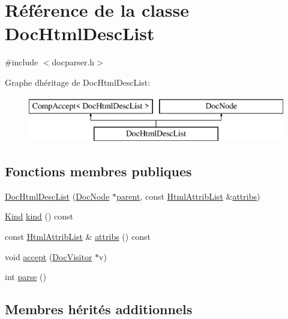 \hypertarget{class_doc_html_desc_list}{}\section{Référence de la classe Doc\+Html\+Desc\+List}
\label{class_doc_html_desc_list}


{\ttfamily \#include $<$docparser.\+h$>$}

Graphe d\textquotesingle{}héritage de Doc\+Html\+Desc\+List\+:\begin{figure}[H]
\begin{center}
\leavevmode
\includegraphics[height=2.000000cm]{class_doc_html_desc_list}
\end{center}
\end{figure}
\subsection*{Fonctions membres publiques}
\begin{DoxyCompactItemize}
\item 
\hyperlink{class_doc_html_desc_list_accd23dc4f88dc9b9831a176f9f10c1f3}{Doc\+Html\+Desc\+List} (\hyperlink{class_doc_node}{Doc\+Node} $\ast$\hyperlink{class_doc_node_a990d8b983962776a647e6231d38bd329}{parent}, const \hyperlink{class_html_attrib_list}{Html\+Attrib\+List} \&\hyperlink{class_doc_html_desc_list_a50d6e8c2f6b16f5300ce9125977e3d44}{attribs})
\item 
\hyperlink{class_doc_node_aebd16e89ca590d84cbd40543ea5faadb}{Kind} \hyperlink{class_doc_html_desc_list_a6b4a7203e86e33ed7da41acf08c38048}{kind} () const 
\item 
const \hyperlink{class_html_attrib_list}{Html\+Attrib\+List} \& \hyperlink{class_doc_html_desc_list_a50d6e8c2f6b16f5300ce9125977e3d44}{attribs} () const 
\item 
void \hyperlink{class_doc_html_desc_list_a3e5ceeb75fd9713c900f4eb375c4e64b}{accept} (\hyperlink{class_doc_visitor}{Doc\+Visitor} $\ast$v)
\item 
int \hyperlink{class_doc_html_desc_list_a9873174137ece02520433d67717de09a}{parse} ()
\end{DoxyCompactItemize}
\subsection*{Membres hérités additionnels}


